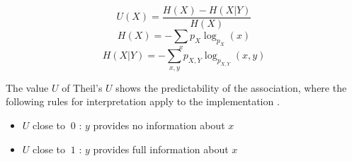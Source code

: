 \smallskip
\begin{equation}
\label{formula_theils}
	U(X) = \frac{H(X)-H(X|Y)}{H(X)}
\end{equation}
\begin{equation}
\label{formula_theils_hx}
	H(X) = -\sum_{x} p_{X} \log_{p_X} (x)
\end{equation}
\begin{equation}
\label{formula_theils_hxy}
	H(X|Y) = -\sum_{x,y} p_{X,Y} \log_{p_{X,Y}} (x,y)
\end{equation}


The value $U$ of Theil's $U$ shows the predictability of the association, where the following rules for interpretation apply to the implementation \parencite{TheilsInt01,TheilsInt02,TheilsInt03}.

\begin{itemize}
	\item $U$ close to $\: 0$ : $y$ provides no information about $x$
	\item $U$ close to $\: 1$ : $y$ provides full information about $x$
\end{itemize}